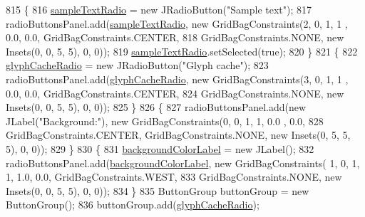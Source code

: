 \begin{DoxyCode}
815                 \{
816                     \mbox{\hyperlink{classorg_1_1newdawn_1_1slick_1_1tools_1_1hiero_1_1_hiero_ab6178cf8bcd6425842e1b3fd20465e9e}{sampleTextRadio}} = \textcolor{keyword}{new} JRadioButton(\textcolor{stringliteral}{"Sample text"});
817                     radioButtonsPanel.add(\mbox{\hyperlink{classorg_1_1newdawn_1_1slick_1_1tools_1_1hiero_1_1_hiero_ab6178cf8bcd6425842e1b3fd20465e9e}{sampleTextRadio}}, \textcolor{keyword}{new} GridBagConstraints(2, 0, 1, 1
      , 0.0, 0.0, GridBagConstraints.CENTER,
818                         GridBagConstraints.NONE, \textcolor{keyword}{new} Insets(0, 0, 5, 5), 0, 0));
819                     \mbox{\hyperlink{classorg_1_1newdawn_1_1slick_1_1tools_1_1hiero_1_1_hiero_ab6178cf8bcd6425842e1b3fd20465e9e}{sampleTextRadio}}.setSelected(\textcolor{keyword}{true});
820                 \}
821                 \{
822                     \mbox{\hyperlink{classorg_1_1newdawn_1_1slick_1_1tools_1_1hiero_1_1_hiero_a68ef2d71c04ce9de0f557b8ee106f45c}{glyphCacheRadio}} = \textcolor{keyword}{new} JRadioButton(\textcolor{stringliteral}{"Glyph cache"});
823                     radioButtonsPanel.add(\mbox{\hyperlink{classorg_1_1newdawn_1_1slick_1_1tools_1_1hiero_1_1_hiero_a68ef2d71c04ce9de0f557b8ee106f45c}{glyphCacheRadio}}, \textcolor{keyword}{new} GridBagConstraints(3, 0, 1, 1
      , 0.0, 0.0, GridBagConstraints.CENTER,
824                         GridBagConstraints.NONE, \textcolor{keyword}{new} Insets(0, 0, 5, 5), 0, 0));
825                 \}
826                 \{
827                     radioButtonsPanel.add(\textcolor{keyword}{new} JLabel(\textcolor{stringliteral}{"Background:"}), \textcolor{keyword}{new} GridBagConstraints(0, 0, 1, 1, 0.0
      , 0.0,
828                         GridBagConstraints.CENTER, GridBagConstraints.NONE, \textcolor{keyword}{new} Insets(0, 5, 5, 5), 0, 0));
829                 \}
830                 \{
831                     \mbox{\hyperlink{classorg_1_1newdawn_1_1slick_1_1tools_1_1hiero_1_1_hiero_a04c540a8cc98417075e589a6aa7e0ad1}{backgroundColorLabel}} = \textcolor{keyword}{new} JLabel();
832                     radioButtonsPanel.add(\mbox{\hyperlink{classorg_1_1newdawn_1_1slick_1_1tools_1_1hiero_1_1_hiero_a04c540a8cc98417075e589a6aa7e0ad1}{backgroundColorLabel}}, \textcolor{keyword}{new} GridBagConstraints(
      1, 0, 1, 1, 1.0, 0.0, GridBagConstraints.WEST,
833                         GridBagConstraints.NONE, \textcolor{keyword}{new} Insets(0, 0, 5, 5), 0, 0));
834                 \}
835                 ButtonGroup buttonGroup = \textcolor{keyword}{new} ButtonGroup();
836                 buttonGroup.add(\mbox{\hyperlink{classorg_1_1newdawn_1_1slick_1_1tools_1_1hiero_1_1_hiero_a68ef2d71c04ce9de0f557b8ee106f45c}{glyphCacheRadio}});

\end{DoxyCode}
